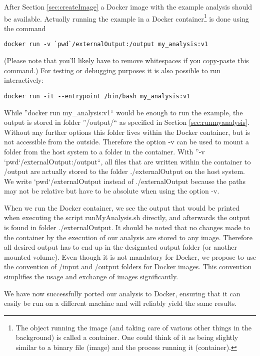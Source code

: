 \documentclass[a4paper, twoside, 11pt]{article}
\begin{document}
After Section \ref{sec:createImage} a Docker image with the example analysis should be available. 
Actually running the example in a Docker container\footnote{The object running the image 
(and taking care of various other things in the background) is called a container. 
One could think of it as being slightly similar to a binary file (image) and the process running it (container).} 
is done using the command 
\begin{lstlisting}[basicstyle=\ttfamily\small,upquote=true,columns=flexible,keepspaces=true,frame=single]
docker run -v `pwd`/externalOutput:/output my_analysis:v1
\end{lstlisting}
(Please note that you'll likely have to remove whitespaces if you copy-paste this command.)
For testing or debugging purposes it is also possible to run interactively:
\begin{lstlisting}[basicstyle=\ttfamily\small,upquote=true,columns=flexible,keepspaces=true,frame=single]
docker run -it --entrypoint /bin/bash my_analysis:v1
\end{lstlisting}
While ''docker run my\_analysis:v1``
would be enough to run the example, the output is stored in folder 
''/output/`` as specified in Section \ref{sec:runmyanalysis}.
Without any further options this folder lives within the Docker container, but is not accessible from the outside. 
Therefore the option -v can be used to mount a folder from the host system to a folder in the container. 
With ''-v `pwd`/externalOutput:/output``, all files that are written within the container to /output 
are actually stored to the folder ./externalOutput on the host system. 
We write `pwd`/externalOutput instead of ./externalOutput because the 
paths may not be relative but have to be absolute when using the option -v. 

When we run the Docker container, we see the output that would be printed when 
executing the script runMyAnalysis.sh directly, and afterwards the output is found in folder ./externalOutput. 
It should be noted that no changes made to the container by the execution of our analysis 
are stored to any image. 
Therefore all desired output has to end up in the designated output folder (or another mounted volume). 
Even though it is not mandatory for Docker, 
we propose to use the convention of /input and /output folders for Docker images. 
This convention simplifies the usage and exchange of images significantly. 

We have now successfully ported our analysis to Docker, ensuring that it can easily be run  
on a different machine and will reliably yield the same results. 
\end{document}

